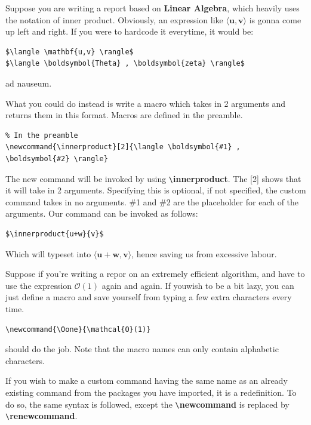 \documentclass{article}
\theoremstyle{remark}
\begin{document}
    Suppose you are writing a report based on \textbf{Linear Algebra}, which heavily uses the notation of inner product.
    Obviously, an expression like $\langle \mathbf{u,v} \rangle$ is gonna come up left and right.
    If you were to hardcode it everytime, it would be:

\begin{lstlisting}
$\langle \mathbf{u,v} \rangle$
$\langle \boldsymbol{Theta} , \boldsymbol{zeta} \rangle$
\end{lstlisting}
    ad nauseum.

    What you could do instead is write a macro which takes in 2 arguments and returns them in this format.
    Macros are defined in the preamble.
\begin{lstlisting}
% In the preamble
\newcommand{\innerproduct}[2]{\langle \boldsymbol{#1} , \boldsymbol{#2} \rangle}
\end{lstlisting}

    The new command will be invoked by using \verb!\!\textbf{innerproduct}. The [2] shows that it will take in 2 arguments.
    Specifying this is optional, if not specified, the custom command takes in no arguments.
    \#1 and \#2 are the placeholder for each of the arguments. Our command can be invoked as follows: 

\begin{lstlisting}
$\innerproduct{u+w}{v}$
\end{lstlisting}

    Which will typeset into $\langle \boldsymbol{u+w} , \boldsymbol{v} \rangle$, hence saving us from excessive labour.

    Suppose if you're writing a repor on an extremely efficient algorithm, and have to use the expression
    $\mathcal{O}(1)$ again and again. If youwish to be a bit lazy, you can just define a macro and save yourself from typing a few extra characters
    every time.
\begin{lstlisting}
\newcommand{\Oone}{\mathcal{O}(1)}
\end{lstlisting}
    
    should do the job. Note that the macro names can only contain alphabetic characters.

    If you wish to make a custom command having the same name as an already existing command
    from the packages you have imported, it is a redefinition. To do so, the same syntax is followed,
    except the \verb!\!\textbf{newcommand} is replaced by \verb!\!\textbf{renewcommand}.
\end{document}
